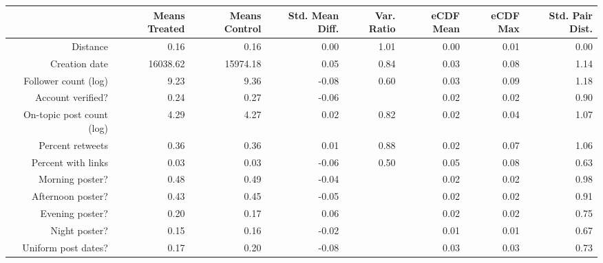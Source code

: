 \begin{table}[ht]
\centering
\begin{tabular}{rrrrrrrr}
  & Means Treated & Means Control & Std. Mean Diff. & Var. Ratio & eCDF Mean & eCDF Max & Std. Pair Dist. \\ 
  \hline
Distance & 0.16 & 0.16 & 0.00 & 1.01 & 0.00 & 0.01 & 0.00 \\ 
   \hline
Creation date & 16038.62 & 15974.18 & 0.05 & 0.84 & 0.03 & 0.08 & 1.14 \\ 
   \hline
Follower count (log) & 9.23 & 9.36 & -0.08 & 0.60 & 0.03 & 0.09 & 1.18 \\ 
   \hline
Account verified? & 0.24 & 0.27 & -0.06 &  & 0.02 & 0.02 & 0.90 \\ 
   \hline
On-topic post count (log) & 4.29 & 4.27 & 0.02 & 0.82 & 0.02 & 0.04 & 1.07 \\ 
   \hline
Percent retweets & 0.36 & 0.36 & 0.01 & 0.88 & 0.02 & 0.07 & 1.06 \\ 
   \hline
Percent with links & 0.03 & 0.03 & -0.06 & 0.50 & 0.05 & 0.08 & 0.63 \\ 
   \hline
Morning poster? & 0.48 & 0.49 & -0.04 &  & 0.02 & 0.02 & 0.98 \\ 
   \hline
Afternoon poster? & 0.43 & 0.45 & -0.05 &  & 0.02 & 0.02 & 0.91 \\ 
   \hline
Evening poster? & 0.20 & 0.17 & 0.06 &  & 0.02 & 0.02 & 0.75 \\ 
   \hline
Night poster? & 0.15 & 0.16 & -0.02 &  & 0.01 & 0.01 & 0.67 \\ 
   \hline
Uniform post dates? & 0.17 & 0.20 & -0.08 &  & 0.03 & 0.03 & 0.73 \\ 
   \hline
\end{tabular}
\end{table}
